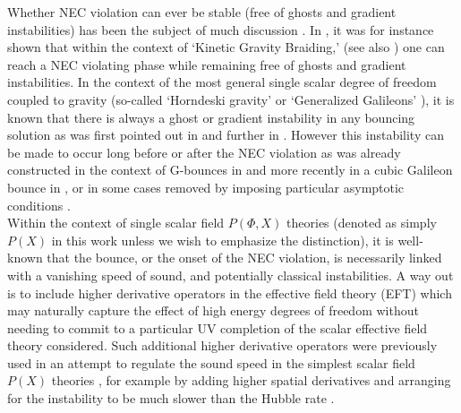 \documentclass[12pt]{article}
\begin{document}
Whether NEC violation can ever be stable (free of ghosts and gradient instabilities) has been the subject of much discussion \cite{Holdom:2004yx, Cline:2003gs, Dubovsky:2005xd, Creminelli:2006xe}. In \cite{Deffayet:2010qz}, it was for instance shown that within the context of `Kinetic Gravity Braiding,' (see also \cite{Pujolas:2011he}) one can reach a NEC violating phase while remaining free of ghosts and gradient instabilities.
In the context of the most general single scalar degree of freedom  coupled to gravity (so-called `Horndeski gravity' \cite{Horndeski:1974wa} or `Generalized Galileons' \cite{Deffayet:2009mn}), it is known that there is always a ghost or gradient instability in any bouncing solution as was first pointed out in \cite{Easson:2011zy} and further in \cite{Rubakov:2013kaa, Libanov:2016kfc, Kobayashi:2016xpl,Akama:2017jsa}. However this instability can be made to occur long before or after the NEC violation as was already constructed in the context of G-bounces in \cite{Easson:2011zy} and more recently in a cubic Galileon bounce in \cite{Ijjas:2016tpn}, or in some cases removed by imposing particular asymptotic conditions \cite{Ijjas:2016vtq}. \\

Within the context of single scalar field $P(\Phi, X)$ theories (denoted as simply $P(X)$ in this work unless we wish to emphasize the distinction), it is well-known that the bounce, or the onset of the NEC violation, is necessarily linked with a vanishing speed of sound, and potentially classical instabilities. A way out is to include higher derivative operators in the effective field theory (EFT) which may naturally capture the effect of high energy degrees of freedom without needing to commit to a particular UV completion of the scalar effective field theory considered. Such additional higher derivative operators were previously used in an attempt to regulate the sound speed in the simplest scalar field $P(X)$ theories \cite{ArkaniHamed:2003uy}, for example by adding higher spatial derivatives and arranging for the instability to be much slower than the Hubble rate \cite{Creminelli:2006xe}. \\
\end{document}
